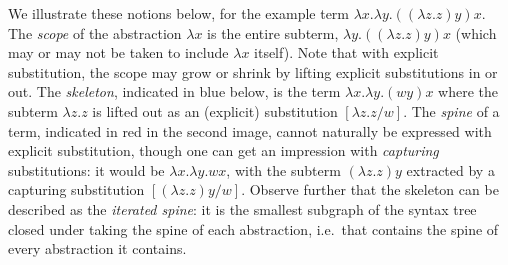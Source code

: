 \documentclass[a4paper,UKenglish,cleveref, autoref]{lipics-v2019}
\begin{document}
We illustrate these notions below, for the example term $\lambda x.\lambda y.((\lambda z.z)y)x$. The \emph{scope} of the abstraction $\lambda x$ is the entire subterm, $\lambda y.((\lambda z.z)y)x$ (which may or may not be taken to include $\lambda x$ itself). Note that with explicit substitution, the scope may grow or shrink by lifting explicit substitutions in or out. The \emph{skeleton}, indicated in blue below, is the term $\lambda x.\lambda y.(wy)x$ where the subterm $\lambda z.z$ is lifted out as an (explicit) substitution $[\lambda z.z/w]$. The \emph{spine} of a term, indicated in red in the second image, cannot naturally be expressed with explicit substitution, though one can get an impression with \emph{capturing} substitutions: it would be $\lambda x.\lambda y.wx$, with the subterm $(\lambda z.z)y$ extracted by a capturing substitution $[(\lambda z.z)y/w]$. Observe further that the skeleton can be described as the \emph{iterated spine}: it is the smallest subgraph of the syntax tree closed under taking the spine of each abstraction, i.e.\ that contains the spine of every abstraction it contains.
%
\end{document}
